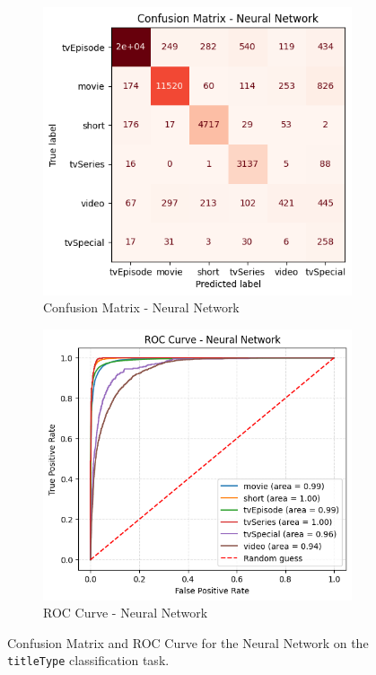 \begin{figure}[H]
    \centering
    \begin{subfigure}[b]{0.47\textwidth}
        \centering
        \includegraphics[width=\textwidth]{plotsss/cm_nn_titletype.png}
        \caption{Confusion Matrix - Neural Network}
        \label{fig:cm_nn_titletype}
    \end{subfigure}
    \hfill
    \begin{subfigure}[b]{0.50\textwidth}
        \centering
        \includegraphics[width=\textwidth]{plotsss/roc_nn_titletype.png}
        \caption{ROC Curve - Neural Network}
        \label{fig:roc_nn_titletype}
    \end{subfigure}
    \caption{Confusion Matrix and ROC Curve for the Neural Network on the \texttt{titleType} classification task.}
    \label{fig:cm_nn_titletype}
\end{figure}

